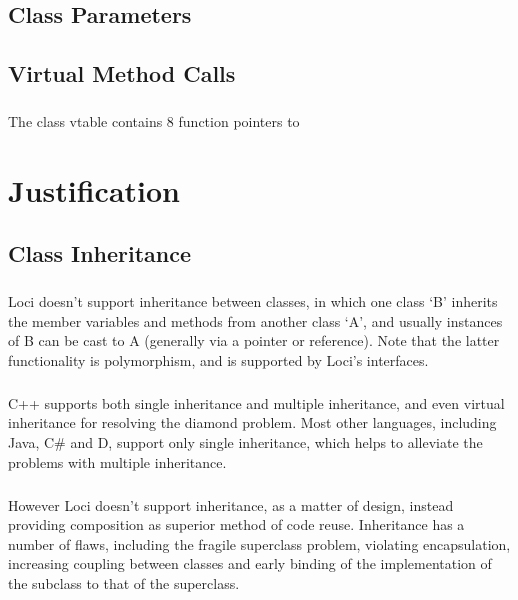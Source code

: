 \documentclass[12pt,twoside,notitlepage]{report}
\begin{document}
\section{Class Parameters}

\paragraph{}


\section{Virtual Method Calls}

\paragraph{}
The class vtable contains 8 function pointers to 

\cleardoublepage

\chapter{Justification}

\section{Class Inheritance}

\paragraph{}
Loci doesn't support inheritance between classes, in which one class `B' inherits the member variables and methods from another class `A', and usually instances of B can be cast to A (generally via a pointer or reference). Note that the latter functionality is polymorphism, and is supported by Loci's interfaces.

\paragraph{}
C++ supports both single inheritance and multiple inheritance, and even virtual inheritance for resolving the diamond problem. Most other languages, including Java, C\# and D, support only single inheritance, which helps to alleviate the problems with multiple inheritance.

\paragraph{}
However Loci doesn't support inheritance, as a matter of design, instead providing composition as superior method of code reuse. Inheritance has a number of flaws, including the fragile superclass problem, violating encapsulation, increasing coupling between classes and early binding of the implementation of the subclass to that of the superclass.
\end{document}
